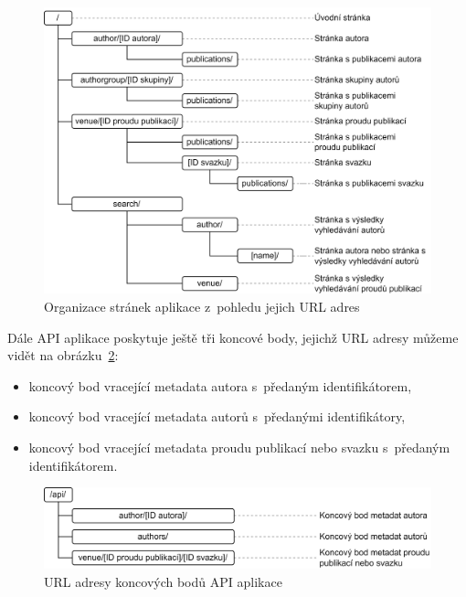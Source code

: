 \documentclass[
  biblatex,
  sourcecodes,
  glossaries,
  index
]{kidiplom}
\begin{document}
\begin{figure}[H]
\begin{center}
\includegraphics[width=\textwidth]{urls_lokalnich_stranek}
\caption{Organizace stránek aplikace z~pohledu jejich URL adres}\label{fig:struktura_url_adres_stranek_aplikace}
\end{center}
\end{figure}

Dále API aplikace poskytuje ještě tři koncové body, jejichž URL adresy můžeme vidět na obrázku~\ref{fig:struktura_url_adres_api_aplikace}:
\begin{itemize}
\item koncový bod vracející metadata autora s~předaným identifikátorem,
\item koncový bod vracející metadata autorů s~předanými identifikátory,
\item koncový bod vracející metadata proudu publikací nebo svazku s~předaným identifikátorem.
\end{itemize}

\begin{figure}[H]
\begin{center}
\includegraphics[width=\textwidth]{urls_lokalniho_api}
\caption{URL adresy koncových bodů API aplikace}\label{fig:struktura_url_adres_api_aplikace}
\end{center}
\end{figure}
\end{document}
